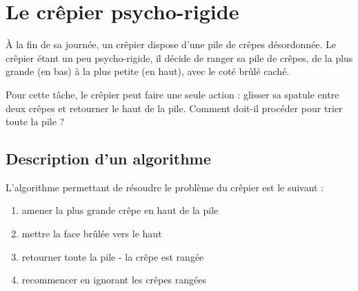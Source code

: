 \documentclass[a5paper,pagesize,DIV=14]{scrbook}
\begin{document}
\chapter*{Le crêpier psycho-rigide}

À la fin de sa journée, un crêpier dispose d'une pile de crêpes désordonnée. Le
crêpier étant un peu psycho-rigide, il décide de ranger sa pile de crêpes, de la
plus grande (en bas) à la plus petite (en haut), avec le coté brûlé caché.

\begin{center}
  
\end{center}

Pour cette tâche, le crêpier peut faire une seule action : glisser sa spatule
entre deux crêpes et retourner le haut de la pile. Comment doit-il procéder pour
trier toute la pile ?

\begin{center}
  
\end{center}



\newpage

\section*{Description d'un algorithme}

L'algorithme permettant de résoudre le problème du crêpier est le suivant :

\begin{enumerate}
\item amener la plus grande crêpe en haut de la pile
\item mettre la face brûlée vers le haut
\item retourner toute la pile - la crêpe est rangée
\item recommencer en ignorant les crêpes rangées
\end{enumerate}
\end{document}
